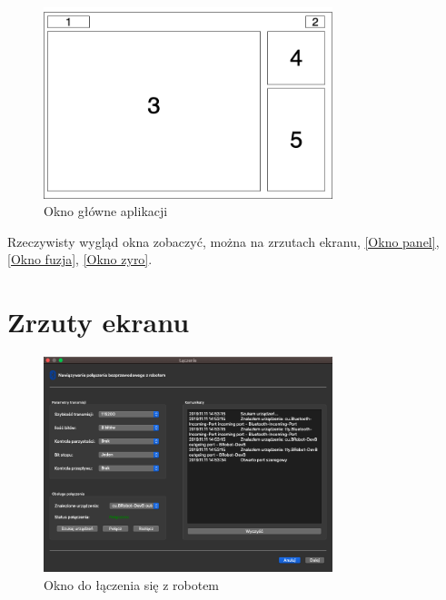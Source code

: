\begin{figure}[h!]
    \centering
    \includegraphics[width=0.75\textwidth]{Rysunki/Rozdzial06/Glowne_okno_koncepcja.png}
    \caption{Okno główne aplikacji}
    \label{Okno glowne}
\end{figure}

Rzeczywisty wygląd okna zobaczyć, można na zrzutach ekranu, \ref{Okno panel}, \ref{Okno fuzja}, \ref{Okno zyro}.

\section{Zrzuty ekranu}

\begin{figure}[h!]
    \centering
    \includegraphics[width=0.75\textwidth]{Rysunki/Rozdzial06/Okno_laczenia.png}
    \caption{Okno do łączenia się z robotem}
    \label{Okno laczenie}
\end{figure}

